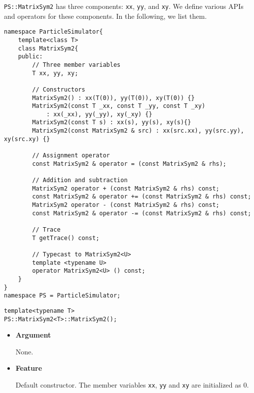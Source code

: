 \texttt{PS::MatrixSym2} has three components: \texttt{xx}, \texttt{yy}, and \texttt{xy}.
We define various APIs and operators for these components.
In the following, we list them.
\begin{lstlisting}[caption=MatrixSym2]
namespace ParticleSimulator{
    template<class T>
    class MatrixSym2{
    public:
        // Three member variables
        T xx, yy, xy;

        // Constructors
        MatrixSym2() : xx(T(0)), yy(T(0)), xy(T(0)) {}
        MatrixSym2(const T _xx, const T _yy, const T _xy)
            : xx(_xx), yy(_yy), xy(_xy) {}
        MatrixSym2(const T s) : xx(s), yy(s), xy(s){}
        MatrixSym2(const MatrixSym2 & src) : xx(src.xx), yy(src.yy), xy(src.xy) {}

        // Assignment operator
        const MatrixSym2 & operator = (const MatrixSym2 & rhs);

        // Addition and subtraction
        MatrixSym2 operator + (const MatrixSym2 & rhs) const;
        const MatrixSym2 & operator += (const MatrixSym2 & rhs) const;
        MatrixSym2 operator - (const MatrixSym2 & rhs) const;
        const MatrixSym2 & operator -= (const MatrixSym2 & rhs) const;

        // Trace
        T getTrace() const;

        // Typecast to MatrixSym2<U>
        template <typename U>
        operator MatrixSym2<U> () const;
    }
}
namespace PS = ParticleSimulator;
\end{lstlisting}


\begin{screen}
\begin{verbatim}
template<typename T>
PS::MatrixSym2<T>::MatrixSym2();
\end{verbatim}
\end{screen}

\begin{itemize}

\item{{\bf Argument}}

  None.

\item{{\bf Feature}}

Default constructor. The member variables \texttt{xx}, \texttt{yy} and \texttt{xy} are initialized as 0.

\end{itemize}


